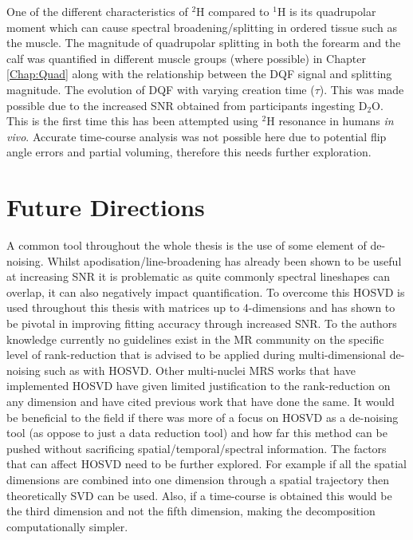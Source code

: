 One of the different characteristics of $^2$H compared to $^1$H is its quadrupolar moment which can cause spectral broadening/splitting in ordered tissue such as the muscle. The magnitude of quadrupolar splitting in both the forearm and the calf was quantified in different muscle groups (where possible) in Chapter \ref{Chap:Quad} along with the relationship between the \ac{DQF} signal and splitting magnitude. The evolution of \ac{DQF} with varying creation time ($\tau$). This was made possible due to the increased \ac{SNR} obtained from participants ingesting D$_2$O. This is the first time this has been attempted using $^2$H resonance in humans \textit{in vivo}. Accurate time-course analysis was not possible here due to potential flip angle errors and partial voluming, therefore this needs further exploration.

\section{Future Directions}

A common tool throughout the whole thesis is the use of some element of de-noising. Whilst apodisation/line-broadening has already been shown to be useful at increasing \ac{SNR} it is problematic as quite commonly spectral lineshapes can overlap, it can also negatively impact quantification. To overcome this \ac{HOSVD} is used throughout this thesis with matrices up to 4-dimensions and has shown to be pivotal in improving fitting accuracy through increased \ac{SNR}. To the authors knowledge currently no guidelines exist in the MR community on the specific level of rank-reduction that is advised to be applied during multi-dimensional de-noising such as with \ac{HOSVD}. Other multi-nuclei \ac{MRS} works that have implemented \ac{HOSVD} have given limited justification to the rank-reduction on any dimension and have cited previous work that have done the same\cite{Kreis2020MeasuringMRI, vonMorze2021ComparisonT, Brender2019DynamicHyperpolarization}. It would be beneficial to the field if there was more of a focus on \ac{HOSVD} as a de-noising tool (as oppose to just a data reduction tool) and how far this method can be pushed without sacrificing spatial/temporal/spectral information. The factors that can affect \ac{HOSVD} need to be further explored. For example if all the spatial dimensions are combined into one dimension through a spatial trajectory then theoretically \ac{SVD} can be used. Also, if a time-course is obtained this would be the third dimension and not the fifth dimension, making the decomposition computationally simpler.


